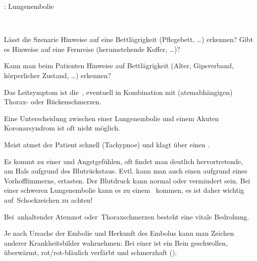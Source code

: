\TextSlide
{\TxABCDE: Lungenembolie}
{~
\begin{ABCDEText}
  \item[\ABCDE{1}] Lässt die Szenarie Hinweise auf eine Bettlägrigkeit
  (Pflegebett, \ldots) erkennen? Gibt es Hinweise auf eine Fernreise (herumstehende Koffer, {\ldots})?
  \item[\ABCDE{2}] Kann man beim Patienten Hinweise auf Bettlägrigkeit (Alter,
  Gipsverband, körperlicher Zustand, \ldots) erkennen?
  \item[\ABCDE{4}] Das Leitsymptom ist die
  {\RedFlag}\,, eventuell in Kombination mit
  (atemabhängigen) {\RedFlag}\,Thorax- oder Rückenschmerzen. 
  
  Eine Unterscheidung zwischen einer Lungenembolie und
  einem Akuten Koronarsyndrom ist oft nicht möglich. 
  \item[\ABCDE{B}] Meist atmet der Patient schnell (Tachypnoe) und klagt über
  einen .
  \item[\ABCDE{C}]  Es kommt zu
  einer  und Angstgefühlen, oft findet man
  deutlich hervortretende, 
  am Hals aufgrund des Blutrückstaus. Evtl. kann man auch einen
   aufgrund eines Vorhofflimmerns, ertasten.
  Der Blutdruck kann normal oder vermindert sein. Bei einer
  schweren Lungenembolie kann es zu einem
  {\RedFlag}\, kommen, es ist daher
  wichtig auf {\RedFlag}\,Schockzeichen zu achten!
  \item[\ABCDE{=}] Bei {\RedFlag}\,anhaltender Atemnot oder
  {\RedFlag}\,Thoraxschmerzen besteht eine vitale Bedrohung.
  \item[\ABCDE{\ldots}] Je nach Ursache der Embolie und
  Herkunft des Embolus kann
  man Zeichen anderer Krankheitsbilder wahrnehmen: Bei einer
   ist ein Bein geschwollen,
  überwärmt, rot/rot-bläulich verfärbt und schmerzhaft
  ().
  
\end{ABCDEText}
}
